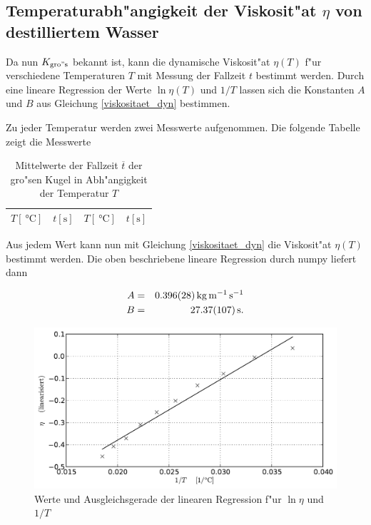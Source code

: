 	\subsection{Temperaturabh"angigkeit der Viskosit"at $\eta$ von destilliertem Wasser}
		\label{sub:temperaturabhaengigkeit}

		Da nun $K_\mathrm{gro"s}$ bekannt ist, kann die dynamische Viskosit"at $\eta (T)$ f"ur verschiedene Tem\-pe\-ra\-tu\-ren $T$ mit Messung der Fallzeit $t$ bestimmt werden.
		Durch eine lineare Regression der Werte $\ln{\eta (T)}$ und $1 / T$ lassen sich die Konstanten $A$ und $B$ aus Gleichung \eqref{viskositaet_dyn} bestimmen.

		Zu jeder Temperatur werden zwei Messwerte aufgenommen. Die folgende Tabelle zeigt die Messwerte

		\begin{table}[h!]
			\centering
			\caption{Mittelwerte der Fallzeit $\overline{t}$ der gro"sen Kugel in Abh"angigkeit der Temperatur $T$}
			\begin{tabular}{|c|c||c|c|}
				\hline
				$T [\SI{}{\celsius}]$ & $t [\mathrm{s}]$ & $T [\SI{}{\celsius}]$ & $t [\mathrm{s}]$ \\
				\hline
				\hline
				
				\hline
			\end{tabular}
		\end{table}

		Aus jedem Wert kann nun mit Gleichung \eqref{viskositaet_dyn} die Viskosit"at $\eta (T)$ bestimmt werden.
		Die oben beschriebene lineare Regression durch numpy liefert dann

		\begin{eqnarray*}
			A & = & \SI{.396 (28)}{\kilo \gram \per \meter \per \second} \\
			B & = & \SI{27.37 (107)}{\second} .
		\end{eqnarray*}

		\begin{figure}[h!]
			\centering
			\includegraphics[width = 15cm]{img/plot.pdf}
			\caption{Werte und Ausgleichsgerade der linearen Regression f"ur $\ln{\eta}$ und $1 / T$}
			\label{fig:regression}
		\end{figure}

